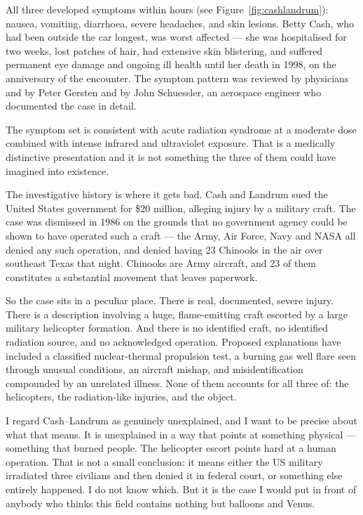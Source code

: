  All three developed symptoms within hours (see Figure~\ref{fig:cashlandrum}): nausea, vomiting, diarrhoea, severe headaches, and skin lesions.
Betty Cash, who had been outside the car longest, was worst affected --- she was hospitalised for
two weeks, lost patches of hair, had extensive skin blistering, and suffered permanent eye damage
and ongoing ill health until her death in 1998, on the anniversary of the encounter. The symptom
pattern was reviewed by physicians and by Peter Gersten and by John Schuessler, an aerospace
engineer who documented the case in detail.

The symptom set is consistent with acute radiation syndrome at a moderate dose combined with
intense infrared and ultraviolet exposure. That is a medically distinctive presentation and it is
not something the three of them could have imagined into existence.

The investigative history is where it gets bad. Cash and Landrum sued the United States government
for \$20 million, alleging injury by a military craft. The case was dismissed in 1986 on the
grounds that no government agency could be shown to have operated such a craft --- the Army, Air
Force, Navy and NASA all denied any such operation, and denied having 23 Chinooks in the air over
southeast Texas that night. Chinooks are Army aircraft, and 23 of them constitutes a substantial
movement that leaves paperwork.

So the case sits in a peculiar place. There is real, documented, severe injury. There is a
description involving a huge, flame-emitting craft escorted by a large military helicopter
formation. And there is no identified craft, no identified radiation source, and no acknowledged
operation. Proposed explanations have included a classified nuclear-thermal propulsion test, a
burning gas well flare seen through unusual conditions, an aircraft mishap, and misidentification
compounded by an unrelated illness. None of them accounts for all three of: the helicopters, the
radiation-like injuries, and the object.

I regard Cash--Landrum as genuinely unexplained, and I want to be precise about what that means. It
is unexplained in a way that points at something physical --- something that burned people. The
helicopter escort points hard at a human operation. That is not a small conclusion: it means either
the US military irradiated three civilians and then denied it in federal court, or something else
entirely happened. I do not know which. But it is the case I would put in front of anybody who
thinks this field contains nothing but balloons and Venus.

